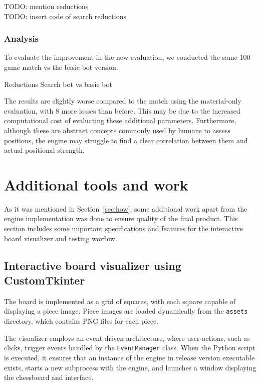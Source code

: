 TODO: mention reductions\\
TODO: insert code of search reductions

\subsubsection{Analysis}

To evaluate the improvement in the new evaluation, we conducted the same 100 game match vs the basic bot version.

\begin{center}
Reductions Search bot vs basic bot\\
\medskip
\end{center}

\noindent The results are slightly worse compared to the match using the material-only evaluation, with 8 more losses than before. This may be due to the increased computational cost of evaluating these additional parameters. Furthermore, although these are abstract concepts commonly used by humans to assess positions, the engine may struggle to find a clear correlation between them and actual positional strength.

\section{Additional tools and work}
\label{sec:tools}

As it was mentioned in Section~\ref{sec:how}, some additional work apart from the engine implementation was done to ensure quality of the final product. This section includes some important specifications and features for the interactive board visualizer and testing worflow.

\subsection{Interactive board visualizer using CustomTkinter}

The board is implemented as a grid of squares, with each square capable of displaying a piece image. Piece images are loaded dynamically from the \texttt{assets} directory, which contains PNG files for each piece.

\vspace{1em}

\noindent The visualizer employs an event-driven architecture, where user actions, such as clicks, trigger events handled by the \texttt{EventManager} class. When the Python script is executed, it ensures that an instance of the engine in release version executable exists, starts a new subprocess with the engine, and launches a window displaying the chessboard and interface.

